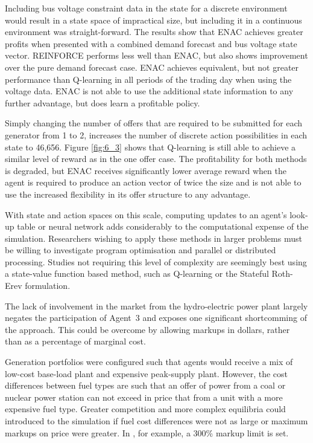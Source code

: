 Including bus voltage constraint data in the state for a discrete environment
would result in a state space of impractical size, but including it in a
continuous environment was straight-forward.  The results show that ENAC
achieves greater profits when presented with a combined demand forecast and bus
voltage state vector.  REINFORCE performs less well than ENAC, but also shows
improvement over the pure demand forecast case.  ENAC achieves equivalent, but
not greater performance than Q-learning in all periods of the trading day when
using the voltage data.  ENAC is not able to use the additional state
information to any further advantage, but does learn a profitable policy.

Simply changing the number of offers that are required to be submitted for each
generator from 1 to 2, increases the number of discrete action possibilities in
each state to 46,656.  Figure \ref{fig:6_3} shows that Q-learning is still able
to achieve a similar level of reward as in the one offer case.  The
profitability for both methods is degraded, but ENAC receives significantly
lower average reward when the agent is required to produce an action
vector of twice the size and is not able to use the increased flexibility in
its offer structure to any advantage.

With state and action spaces on this scale, computing updates to an agent's
look-up table or neural network adds considerably to the computational expense
of the simulation.  Researchers wishing to apply these methods in larger
problems must be willing to investigate program optimisation and parallel or
distributed processing.  Studies not requiring this level of complexity are
seemingly best using a state-value function based method, such as Q-learning or
the Stateful Roth-Erev formulation.

The lack of involvement in the market from the hydro-electric power plant
largely negates the participation of Agent~3 and exposes one significant
shortcomming of the approach. This could be overcome by allowing markups
in dollars, rather than as a percentage of marginal cost.

Generation portfolios were configured such that agents would receive a mix of
low-cost base-load plant and expensive peak-supply plant.  However, the cost
differences between fuel types are such that an offer of power from a coal or
nuclear power station can not exceed in price that from a unit with a more
expensive fuel type.  Greater competition and more complex equilibria could
introduced to the simulation if fuel cost differences were not as large or
maximum markups on price were greater.  In , for example, a
300\% markup limit is set.

